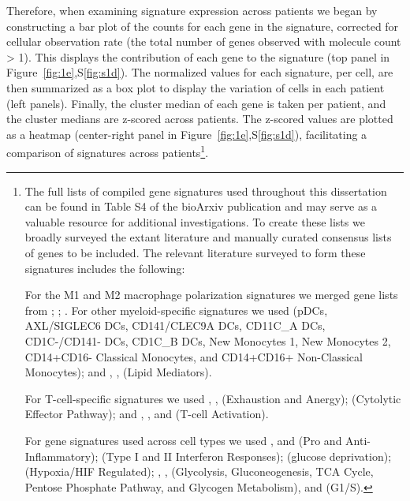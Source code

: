 Therefore, when examining signature expression across patients we began by constructing a bar plot of the counts for each gene in the signature, corrected for cellular observation rate (the total number of genes observed with molecule count \textgreater{} 1).
This displays the contribution of each gene to the signature (top panel in Figure~\ref{fig:1e},S\ref{fig:s1d}).
The normalized values for each signature, per cell, are then summarized as a box plot to display the variation of cells in each patient (left panels).
Finally, the cluster median of each gene is taken per patient, and the cluster medians are z-scored across patients.
The z-scored values are plotted as a heatmap (center-right panel in Figure~\ref{fig:1e},S\ref{fig:s1d}), facilitating a comparison of signatures across patients\footnote{The full lists of compiled gene signatures used throughout this dissertation can be found in Table S4 of the bioArxiv publication and may serve as a valuable resource for additional investigations. %
To create these lists we broadly surveyed the extant literature and manually curated consensus lists of genes to be included.
The relevant literature surveyed to form these signatures includes the following:

For the M1 and M2 macrophage polarization signatures we merged gene lists from \citep{Sica2012}; \citep{Biswas2010}; \citep{Bronte2016} \citep{Ugel2015} \citep{Gabrilovich2017}.
For other myeloid-specific signatures we used \citep{Villani2017} (pDCs, AXL/SIGLEC6 DCs, CD141/CLEC9A DCs, CD11C\_A DCs, CD1C-/CD141- DCs, CD1C\_B DCs, New Monocytes 1, New Monocytes 2, CD14+CD16- Classical Monocytes, and CD14+CD16+ Non-Classical Monocytes); and \citep{Gesta2007}, \citep{Perera2006}, \citep{Farmer2006,Lefterova2009} (Lipid Mediators).

For T-cell-specific signatures we used \citep{Wherry2015}, \citep{Wherry2011}, \citep{Schietinger2012} (Exhaustion and Anergy); \citep{Glimcher2004} (Cytolytic Effector Pathway); and \citep{Smith-Garvin2009}, \citep{Chtanova2005}, and \citep{AdamBest2013} (T-cell Activation).

For gene signatures used across cell types we used \citep{Mantovani2008}, and \citep{Grivennikov2010} (Pro and Anti-Inflammatory); \citep{Platanias2005} (Type I and II Interferon Responses); \citep{Ho2015} (glucose deprivation); \citep{Benita2009,Makino2003} (Hypoxia/HIF Regulated); \citep{Moreno-Sanchez2009}, \citep{Caton2010,Funes2007,Mues2009}, \citep{Beale2007} (Glycolysis, Gluconeogenesis, TCA Cycle, Pentose Phosphate Pathway, and Glycogen Metabolism), and \citep{Whitfield2002} (G1/S).}.


